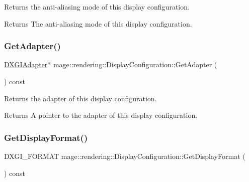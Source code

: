 Returns the anti-\/aliasing mode of this display configuration.

\begin{DoxyReturn}{Returns}
The anti-\/aliasing mode of this display configuration. 
\end{DoxyReturn}
\mbox{\label{classmage_1_1rendering_1_1_display_configuration_a8516379377ff3f6cec7b2d705398459f}} 
\subsubsection{\texorpdfstring{Get\+Adapter()}{GetAdapter()}}
{\footnotesize\ttfamily \mbox{\hyperlink{namespacemage_1_1rendering_ad55e028ebd705b547eeb972ad8d03b6a}{D\+X\+G\+I\+Adapter}}$\ast$ mage\+::rendering\+::\+Display\+Configuration\+::\+Get\+Adapter (\begin{DoxyParamCaption}{ }\end{DoxyParamCaption}) const\hspace{0.3cm}{\ttfamily [noexcept]}}

Returns the adapter of this display configuration.

\begin{DoxyReturn}{Returns}
A pointer to the adapter of this display configuration. 
\end{DoxyReturn}
\mbox{\label{classmage_1_1rendering_1_1_display_configuration_a66c6757aa4c17227ab0e7022228f982a}} 
\subsubsection{\texorpdfstring{Get\+Display\+Format()}{GetDisplayFormat()}}
{\footnotesize\ttfamily D\+X\+G\+I\+\_\+\+F\+O\+R\+M\+AT mage\+::rendering\+::\+Display\+Configuration\+::\+Get\+Display\+Format (\begin{DoxyParamCaption}{ }\end{DoxyParamCaption}) const\hspace{0.3cm}{\ttfamily [noexcept]}}

